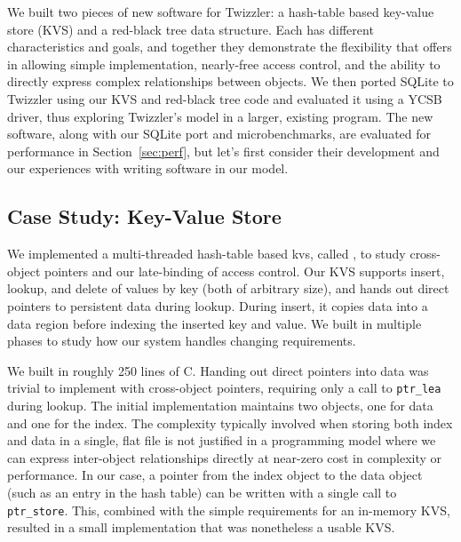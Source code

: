 We built two pieces of new software for Twizzler: a hash-table based key-value store (KVS) and a red-black tree
data structure.  Each has different characteristics and goals, and together they demonstrate the flexibility that
\Twizzler offers in allowing simple implementation, nearly-free access control, and the ability to directly express
complex relationships between objects.  We then ported SQLite to Twizzler using
our KVS and red-black tree code and evaluated it using a YCSB~\cite{ycsb,ycsbc} driver, thus exploring Twizzler's
model in a larger, existing program. The new software, along with our SQLite port and
microbenchmarks, are evaluated for performance in Section~\ref{sec:perf}, but let's first consider their development and our experiences with writing software in our model.


\subsection{Case Study: Key-Value Store}


\label{sec:kv}

We implemented a multi-threaded hash-table based \ac{kvs}, called \nvkv, to
study cross-object pointers and our late-binding of access control.
Our KVS supports insert, lookup, and delete of values by key (both of arbitrary size), and hands
out direct pointers to persistent data during lookup. During insert, it copies data into a data
region before indexing the inserted key and value. We built \nvkv in multiple phases to study how
our system handles changing requirements.

We built \nvkv in roughly 250 lines of C\@. Handing
out direct pointers into data was trivial to implement with cross-object pointers, requiring
only a call to \texttt{ptr\_lea} during lookup. The initial implementation maintains two
objects, one for data and one for the index.  The complexity typically involved when storing both
index and data in a single, flat file is not justified in a programming
model where we can express inter-object relationships directly at
near-zero cost in complexity or performance. In our case, a pointer from the index object
to the data object (such as an entry in the hash table) can be written with a single call to
\texttt{ptr\_store}.
This, combined with the simple requirements for an in-memory \NVM KVS,
resulted in a small implementation that was nonetheless a
usable KVS.

